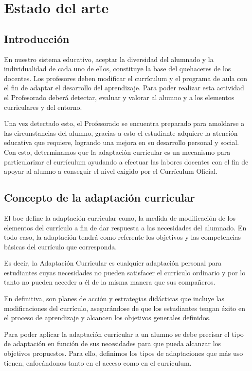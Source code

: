 \chapter{Estado del arte}
\label{cap:estadoDelArte}

\section{Introducción}
En nuestro sistema educativo, aceptar la diversidad del alumnado y la individualidad de cada uno de ellos, constituye la base del quehaceres de los docentes. Los profesores deben modificar el currículum y el programa de aula con el fin de adaptar el desarrollo del aprendizaje. Para poder realizar esta actividad el Profesorado deberá detectar, evaluar y valorar  al alumno y a los elementos curriculares y del entorno.

Una vez detectado esto, el Profesorado se encuentra preparado para amoldarse a las circunstancias del alumno, gracias a esto el estudiante adquiere la atención educativa que requiere, logrando una mejora en su desarrollo personal y social.
Con esto, determinamos que la adaptación curricular es un mecanismo para particularizar el currículum ayudando a efectuar las labores docentes con el fin de apoyar al alumno a conseguir el nivel exigido por el Currículum Oficial.

\section{Concepto de la adaptación curricular}
El boe define la adaptación curricular como, la medida de modificación de los elementos del currículo a fin de dar respuesta a las necesidades del alumnado. En todo caso, la adaptación tendrá como referente los objetivos y las competencias básicas del currículo que corresponda.

Es decir, la Adaptación Curricular es cualquier adaptación personal para estudiantes cuyas necesidades no pueden satisfacer el currículo ordinario y por lo tanto no pueden acceder a él de la misma manera que sus compañeros.

En definitiva, son planes de acción y estrategias didácticas que incluye las modificaciones del currículo, asegurándose de que los estudiantes tengan éxito en el proceso de aprendizaje y alcancen los objetivos generales definidos.

Para poder aplicar la adaptación curricular a un alumno se debe precisar el tipo de adaptación en función de sus necesidades para que pueda alcanzar los objetivos propuestos. Para ello, definimos los tipos de adaptaciones que más uso tienen, enfocándonos tanto en el acceso como en el currículum. 

